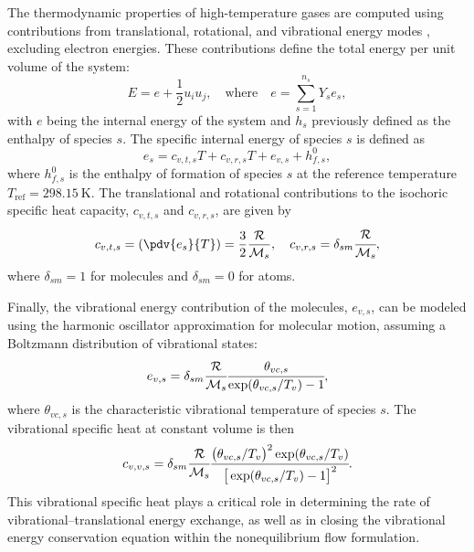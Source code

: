 The thermodynamic properties of high-temperature gases are computed using contributions from translational, rotational, and vibrational energy modes \citep{Gnoffo1989}, excluding electron energies. These contributions define the total energy per unit volume of the system:
\begin{equation}
    E = e + \frac{1}{2} u_i u_j,
    \quad \mathrm{where} \quad 
    e = \sum_{s=1}^{n_s} Y_s e_s,
\end{equation}
with $e$ being the internal energy of the system and $h_s$ previously defined as the enthalpy of species $s$. The specific internal energy of species $s$ is defined as
\begin{equation}
    e_s = c_{v,t,s} T + c_{v,r,s} T + e_{v,s} + h^{0}_{f,s},
\end{equation}
where $h^{0}_{f,s}$ is the enthalpy of formation of species $s$ at the reference temperature $T_{\mathrm{ref}} = 298.15~\mathrm{K}$. The translational and rotational contributions to the isochoric specific heat capacity, $c_{v,t,s}$ and $c_{v,r,s}$, are given by
\begin{equation}
    c_{v,t,s} = \left(\pdv{e_{s}}{T}\right) = \frac{3}{2} \frac{\mathcal{R}}{\mathcal{M}_s},
    \quad
    c_{v,r,s} = \delta_{sm} \cfrac{\mathcal{R}}{\mathcal{M}_s},
\end{equation}
where $\delta_{sm} = 1$ for molecules and $\delta_{sm} = 0$ for atoms.

Finally, the vibrational energy contribution of the molecules, $e_{v,s}$, can be modeled using the harmonic oscillator approximation for molecular motion, assuming a Boltzmann distribution of vibrational states:
\begin{equation}
    e_{v,s} = \delta_{sm} \cfrac{\mathcal{R}}{\mathcal{M}_s} 
    \cfrac{\theta_{vc,s}}{\exp(\theta_{vc,s}/T_{v}) - 1},
\end{equation}
where $\theta_{vc,s}$ is the characteristic vibrational temperature of species $s$. The vibrational specific heat at constant volume is then
\begin{equation}
    c_{v,v,s} = \delta_{sm} \cfrac{\mathcal{R}}{\mathcal{M}_s}
    \cfrac{\big(\theta_{vc,s}/T_{v}\big)^2 \exp(\theta_{vc,s}/T_{v})}{\big[\exp(\theta_{vc,s}/T_{v}) - 1\big]^2}.
\end{equation}
This vibrational specific heat plays a critical role in determining the rate of vibrational--translational energy exchange, as well as in closing the vibrational energy conservation equation within the nonequilibrium flow formulation.

